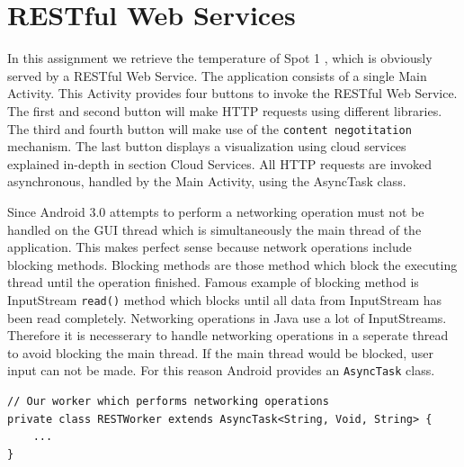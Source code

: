 \documentclass{report}
\begin{document}
\section{RESTful Web Services}
In this assignment we retrieve the temperature of Spot 1 \cite{temperatureSpot1}, which is obviously served by a RESTful Web Service. The application consists of a single Main Activity. This Activity provides four buttons to invoke the RESTful Web Service. The first and second button will make HTTP requests using different libraries. The third and fourth button will make use of the  \texttt{content negotitation} mechanism. The last button displays a visualization using cloud services explained in-depth in section Cloud Services. All HTTP requests are invoked asynchronous, handled by the Main Activity, using the AsyncTask class.

Since Android 3.0 attempts to perform a networking operation must not be handled on the GUI thread which is simultaneously the main thread of the application. This makes perfect sense because network operations include blocking methods. Blocking methods are those method which block the executing thread until the operation finished. Famous example of blocking method is InputStream \texttt{read()} method which blocks until all data from InputStream has been read completely. Networking operations in Java use a lot of InputStreams. Therefore it is necesserary to handle networking operations in a seperate thread to avoid blocking the main thread. If the main thread would be blocked, user input can not be made. For this reason Android provides an \texttt{AsyncTask} class.

	\begin{lstlisting}
// Our worker which performs networking operations
private class RESTWorker extends AsyncTask<String, Void, String> {
	...
}
	\end{lstlisting}
\end{document}
